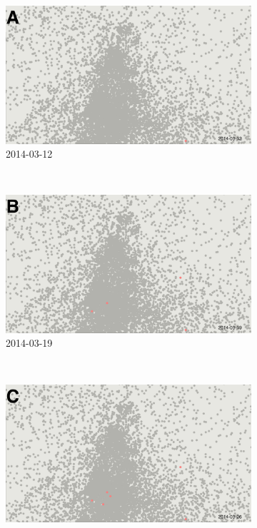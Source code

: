 \begin{figure}
    \centering
    \begin{subfigure}[b]{0.6\textwidth}
        \includegraphics[width=\textwidth]{longitude/figs/visual/seattle0.png}
        \caption*{2014-03-12}
    \end{subfigure}
    ~ %
    \begin{subfigure}[b]{0.6\textwidth}
        \includegraphics[width=\textwidth]{longitude/figs/visual/seattle1.png}
        \caption*{2014-03-19}
    \end{subfigure}
    ~ %
    \begin{subfigure}[b]{0.6\textwidth}
        \includegraphics[width=\textwidth]{longitude/figs/visual/seattle2.png}

\end{subfigure}
\end{figure}
